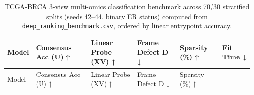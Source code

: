\documentclass[
  10pt,
  letterpaper,
]{report}
\begin{document}
\begin{longtable}[]{@{}
  >{\raggedright\arraybackslash}p{}
  >{\raggedleft\arraybackslash}p{}
  >{\raggedleft\arraybackslash}p{}
  >{\raggedleft\arraybackslash}p{}
  >{\raggedleft\arraybackslash}p{}
  >{\raggedleft\arraybackslash}p{}@{}}
\caption{TCGA-BRCA 3-view multi-omics classification benchmark across
70/30 stratified splits (seeds 42--44, binary ER status) computed from
\protect\texttt{deep\_ranking\_benchmark.csv}, ordered by linear
entrypoint accuracy.}\label{tbl-brca-appendix-results}\tabularnewline
\toprule\noalign{}
\begin{minipage}[b]{\linewidth}\raggedright
Model
\end{minipage} & \begin{minipage}[b]{\linewidth}\raggedleft
Consensus Acc (U) ↑
\end{minipage} & \begin{minipage}[b]{\linewidth}\raggedleft
Linear Probe (XV) ↑
\end{minipage} & \begin{minipage}[b]{\linewidth}\raggedleft
Frame Defect D ↓
\end{minipage} & \begin{minipage}[b]{\linewidth}\raggedleft
Sparsity (\%) ↑
\end{minipage} & \begin{minipage}[b]{\linewidth}\raggedleft
Fit Time ↓
\end{minipage} \\
\midrule\noalign{}
\endfirsthead
\toprule\noalign{}
\begin{minipage}[b]{\linewidth}\raggedright
Model
\end{minipage} & \begin{minipage}[b]{\linewidth}\raggedleft
Consensus Acc (U) ↑
\end{minipage} & \begin{minipage}[b]{\linewidth}\raggedleft
Linear Probe (XV) ↑
\end{minipage} & \begin{minipage}[b]{\linewidth}\raggedleft
Frame Defect D ↓
\end{minipage} & \begin{minipage}[b]{\linewidth}\raggedleft
Sparsity (\%) ↑
\end{minipage} & \begin{minipage}[b]{\linewidth}\raggedleft

\end{minipage}
\end{longtable}
\end{document}
